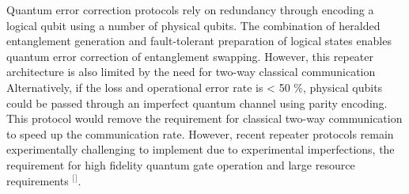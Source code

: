 Quantum error correction protocols rely on redundancy through encoding a logical qubit using a number of physical qubits. The combination of heralded entanglement generation and fault-tolerant preparation of logical states enables quantum error correction of entanglement swapping. However, this repeater architecture is also limited by the need for two-way classical communication Alternatively, if the loss and operational error rate is < 50 \%, physical qubits could be passed through an imperfect quantum channel using parity encoding. This protocol would remove the requirement for classical two-way communication to speed up the communication rate. However, recent repeater protocols remain experimentally challenging to implement due to experimental imperfections, the requirement for high fidelity quantum gate operation and large resource requirements $^{[}$\citep{Muralidharan2016OptimalCommunication,Ralph2005Loss-TolerantQubits}$^{]}$. 

